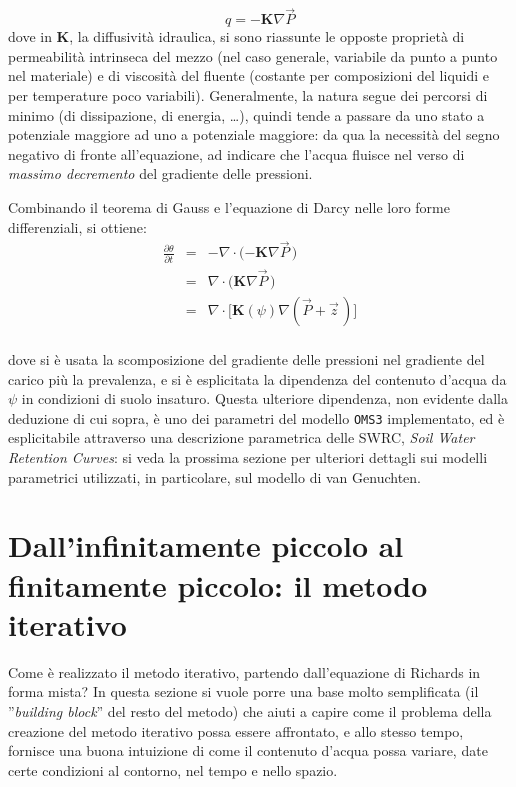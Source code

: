 \documentclass[11pt]{amsart}
\theoremstyle{definition}
\theoremstyle{remark}
\numberwithin{equation}{section}
\begin{document}
\begin{equation}
\label{eqn_darcy_dif}
q= -\mathbf{K} \nabla \vec{P}  
\end{equation}
dove in \textbf{K}, la diffusività idraulica, si sono riassunte le opposte proprietà di permeabilità intrinseca del mezzo (nel caso generale, variabile da
punto a punto nel materiale) e di viscosità del fluente (costante per composizioni del liquidi e per temperature poco variabili).
Generalmente, la natura segue dei percorsi di minimo (di dissipazione, di energia, \dots), quindi tende a passare da uno stato a potenziale maggiore ad uno a 
potenziale maggiore: da qua la necessità del segno negativo di fronte all'equazione, ad indicare che l'acqua fluisce nel verso di \emph{massimo decremento} del gradiente 
delle pressioni.


Combinando il teorema di Gauss e l'equazione di Darcy nelle loro forme differenziali, si ottiene:
\begin{equation}
\begin{align}
\frac{\partial \theta}{\partial t} & = & - \nabla\cdot({-\mathbf{K} \nabla \vec{P}\,)} \\
   & = & \nabla\cdot({\mathbf{K} \nabla \vec{P}\,)} \\
   & = & \nabla\cdot\lbrack{\mathbf{K}(\psi) \nabla (\vec{P}+\vec{z}\,)\rbrack} \\
\end{align}
 \end{equation}
 
 dove si è usata la scomposizione del gradiente delle pressioni nel gradiente del carico più la prevalenza, e si è esplicitata la dipendenza del contenuto 
 d'acqua da $\psi$ in condizioni di suolo insaturo. Questa ulteriore dipendenza, non evidente dalla deduzione di cui sopra, è uno dei parametri del modello \texttt{OMS3}
 implementato, ed è esplicitabile attraverso una descrizione parametrica delle SWRC, \emph{Soil Water Retention Curves}: si veda la prossima sezione per ulteriori 
 dettagli sui modelli parametrici utilizzati, in particolare, sul modello di van Genuchten. 

\section{Dall'infinitamente piccolo al finitamente piccolo: il metodo iterativo}
\label{appendix:iterations}
Come è realizzato il metodo iterativo, partendo dall'equazione di Richards in forma mista? In questa sezione si vuole porre una base 
molto semplificata (il ''\emph{building block}'' del resto del metodo) che aiuti a capire come il problema della creazione del metodo iterativo possa essere
affrontato, e allo stesso tempo, fornisce una buona intuizione di come il contenuto d'acqua possa variare, date certe condizioni al contorno, nel tempo e nello spazio.
\end{document}

